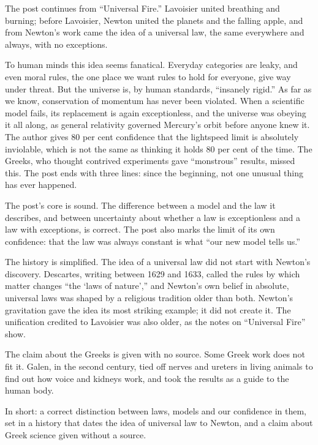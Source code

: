 \begin{afterword}
\summaryhead

The post continues from ``Universal Fire.'' Lavoisier united breathing and burning; before Lavoisier, Newton united the planets and the falling apple, and from Newton's work came the idea of a universal law, the same everywhere and always, with no exceptions.

To human minds this idea seems fanatical. Everyday categories are leaky, and even moral rules, the one place we want rules to hold for everyone, give way under threat. But the universe is, by human standards, ``insanely rigid.'' As far as we know, conservation of momentum has never been violated. When a scientific model fails, its replacement is again exceptionless, and the universe was obeying it all along, as general relativity governed Mercury's orbit before anyone knew it. The author gives 80 per cent confidence that the lightspeed limit is absolutely inviolable, which is not the same as thinking it holds 80 per cent of the time. The Greeks, who thought contrived experiments gave ``monstrous'' results, missed this. The post ends with three lines: since the beginning, not one unusual thing has ever happened.

\responsehead

The post's core is sound. The difference between a model and the law it describes, and between uncertainty about whether a law is exceptionless and a law with exceptions, is correct. The post also marks the limit of its own confidence: that the law was always constant is what ``our new model tells us.''

The history is simplified. The idea of a universal law did not start with Newton's discovery. Descartes, writing between 1629 and 1633, called the rules by which matter changes ``the `laws of nature','' and Newton's own belief in absolute, universal laws was shaped by a religious tradition older than both. Newton's gravitation gave the idea its most striking example; it did not create it. The unification credited to Lavoisier was also older, as the notes on ``Universal Fire'' show.

The claim about the Greeks is given with no source. Some Greek work does not fit it. Galen, in the second century, tied off nerves and ureters in living animals to find out how voice and kidneys work, and took the results as a guide to the human body.

In short: a correct distinction between laws, models and our confidence in them, set in a history that dates the idea of universal law to Newton, and a claim about Greek science given without a source.
\end{afterword}
